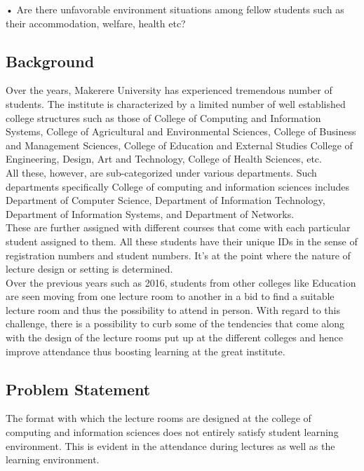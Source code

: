 \documentclass[10pt,a4paper]{report}
\begin{document}
\begin{flushleft}
•	Are there unfavorable environment situations among fellow students such as their accommodation, welfare, health etc?\\

\subsection*{Background}Over the years, Makerere University has experienced tremendous number of students. The institute is characterized by a limited number of well established college structures such as those of College of Computing and Information Systems, College of Agricultural and Environmental Sciences, College of Business and Management Sciences, College of Education and External Studies College of Engineering, Design, Art and Technology,  College of Health Sciences, etc.\\
All these, however, are sub-categorized under various departments. Such departments specifically College of computing and information sciences includes Department of Computer Science, Department of Information Technology, Department of Information Systems, and Department of Networks.\\
These are further assigned with different courses that come with each particular student assigned to them. All these students have their unique IDs in the sense of registration numbers and student numbers. It’s at the point where the nature of lecture design or setting is determined.\\
Over the previous years such as 2016, students from other colleges like Education are seen moving from one lecture room to another in a bid to find a suitable lecture room and thus the possibility to attend in person. With regard to this challenge, there is a possibility to curb some of the tendencies that come along with the design of the lecture rooms put up at the different colleges and hence improve attendance thus boosting learning at the great institute.\\

\subsection*{Problem Statement}The format with which the lecture rooms are designed at the college of computing and information sciences does not entirely satisfy student learning environment. This is evident in the attendance during lectures as well as the learning environment.\\


\end{flushleft}
\end{document}
